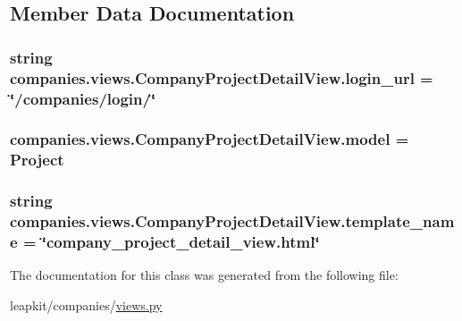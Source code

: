\subsection{Member Data Documentation}
\hypertarget{classcompanies_1_1views_1_1_company_project_detail_view_a3ab5b3d8824353ab40e76b19a7c66dba}{
\subsubsection[{login\-\_\-url}]{\setlength{\rightskip}{0pt plus 5cm}string companies.\-views.\-Company\-Project\-Detail\-View.\-login\-\_\-url = \char`\"{}/companies/login/\char`\"{}\hspace{0.3cm}{\ttfamily [static]}}}\label{classcompanies_1_1views_1_1_company_project_detail_view_a3ab5b3d8824353ab40e76b19a7c66dba}
\hypertarget{classcompanies_1_1views_1_1_company_project_detail_view_af00aea6a349ffb79b8aeedcddda21ad0}{
\subsubsection[{model}]{\setlength{\rightskip}{0pt plus 5cm}companies.\-views.\-Company\-Project\-Detail\-View.\-model = {\bf Project}\hspace{0.3cm}{\ttfamily [static]}}}\label{classcompanies_1_1views_1_1_company_project_detail_view_af00aea6a349ffb79b8aeedcddda21ad0}
\hypertarget{classcompanies_1_1views_1_1_company_project_detail_view_a683f0a62c8c6511d59465ee294889e90}{
\subsubsection[{template\-\_\-name}]{\setlength{\rightskip}{0pt plus 5cm}string companies.\-views.\-Company\-Project\-Detail\-View.\-template\-\_\-name = \char`\"{}company\-\_\-project\-\_\-detail\-\_\-view.\-html\char`\"{}\hspace{0.3cm}{\ttfamily [static]}}}\label{classcompanies_1_1views_1_1_company_project_detail_view_a683f0a62c8c6511d59465ee294889e90}


The documentation for this class was generated from the following file\-:\begin{DoxyCompactItemize}
\item 
leapkit/companies/\hyperlink{companies_2views_8py}{views.\-py}\end{DoxyCompactItemize}
